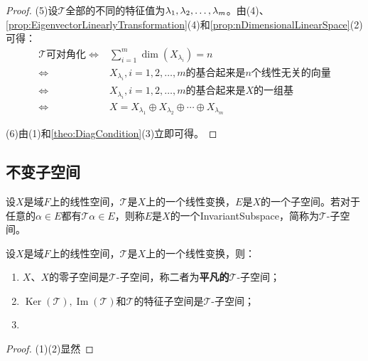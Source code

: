 \begin{proof}
	(5)设$\mathcal{T}$全部的不同的特征值为$\lambda_1, \lambda_2, \dots, \lambda_{m}$。由(4)、\cref{prop:EigenvectorLinearlyTransformation}(4)和\cref{prop:nDimensionalLinearSpace}(2)可得：
	\begin{align*}
		\mathcal{T}\text{可对角化}
		\iff&\sum_{i=1}^{m}\dim(X_{\lambda_i})=n \\
		\iff&X_{\lambda_i},i=1,2,\dots,m\text{的基合起来是$n$个线性无关的向量} \\
		\iff&X_{\lambda_i},i=1,2,\dots,m\text{的基合起来是$X$的一组基} \\
		\iff&X=X_{\lambda_1}\oplus X_{\lambda_2}\oplus\cdots\oplus X_{\lambda_m}
	\end{align*}\par
	(6)由(1)和\cref{theo:DiagCondition}(3)立即可得。
\end{proof}

\subsection{不变子空间}
\begin{definition}
	设$X$是域$F$上的线性空间，$\mathcal{T}$是$X$上的一个线性变换，$E$是$X$的一个子空间。若对于任意的$\alpha\in E$都有$\mathcal{T}\alpha\in E$，则称$E$是$X$的一个\gls{InvariantSubspace}，简称为$\mathcal{T}$-子空间。
\end{definition}
\begin{property}
	设$X$是域$F$上的线性空间，$\mathcal{T}$是$X$上的一个线性变换，则：
	\begin{enumerate}
		\item $X$、$X$的零子空间是$\mathcal{T}$-子空间，称二者为\textbf{平凡的}$\mathcal{T}$-子空间；
		\item $\operatorname{Ker}(\mathcal{T}),\operatorname{Im}(\mathcal{T})$和$\mathcal{T}$的特征子空间是$\mathcal{T}$-子空间；
		\item 
	\end{enumerate}
\end{property}
\begin{proof}
	(1)(2)显然
\end{proof}


